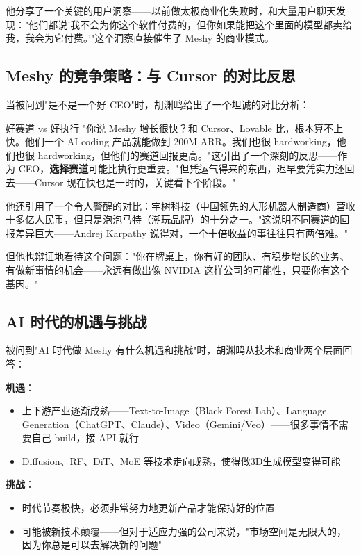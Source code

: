 \documentclass[a4paper]{article}
\begin{document}
他分享了一个关键的用户洞察——以前做太极商业化失败时，和大量用户聊天发现："他们都说'我不会为你这个软件付费的，但你如果能把这个里面的模型都卖给我，我会为它付费。'"这个洞察直接催生了 Meshy 的商业模式。

\subsection{Meshy 的竞争策略：与 Cursor 的对比反思}

当被问到"是不是一个好 CEO"时，胡渊鸣给出了一个坦诚的对比分析：

\begin{knowledgebox}{好赛道 vs 好执行}
"你说 Meshy 增长很快？和 Cursor、Lovable 比，根本算不上快。他们一个 AI coding 产品就能做到 200M ARR。我们也很 hardworking，他们也很 hardworking，但他们的赛道回报更高。"这引出了一个深刻的反思——作为 CEO，\textbf{选择赛道}可能比执行更重要。"但凭运气得来的东西，迟早要凭实力还回去——Cursor 现在快也是一时的，关键看下个阶段。"
\end{knowledgebox}

他还引用了一个令人警醒的对比：宇树科技（中国领先的人形机器人制造商）营收十多亿人民币，但只是泡泡马特（潮玩品牌）的十分之一。"这说明不同赛道的回报差异巨大——Andrej Karpathy 说得对，一个十倍收益的事往往只有两倍难。"

但他也辩证地看待这个问题："你在牌桌上，你有好的团队、有稳步增长的业务、有做新事情的机会——永远有做出像 NVIDIA 这样公司的可能性，只要你有这个基因。"

\subsection{AI 时代的机遇与挑战}

被问到"AI 时代做 Meshy 有什么机遇和挑战"时，胡渊鸣从技术和商业两个层面回答：

\textbf{机遇}：
\begin{itemize}
\item 上下游产业逐渐成熟——Text-to-Image（Black Forest Lab）、Language Generation（ChatGPT、Claude）、Video（Gemini/Veo）——很多事情不需要自己 build，接 API 就行
\item Diffusion、RF、DiT、MoE 等技术走向成熟，使得做3D生成模型变得可能
\end{itemize}

\textbf{挑战}：
\begin{itemize}
\item 时代节奏极快，必须非常努力地更新产品才能保持好的位置
\item 可能被新技术颠覆——但对于适应力强的公司来说，"市场空间是无限大的，因为你总是可以去解决新的问题"
\end{itemize}
\end{document}
